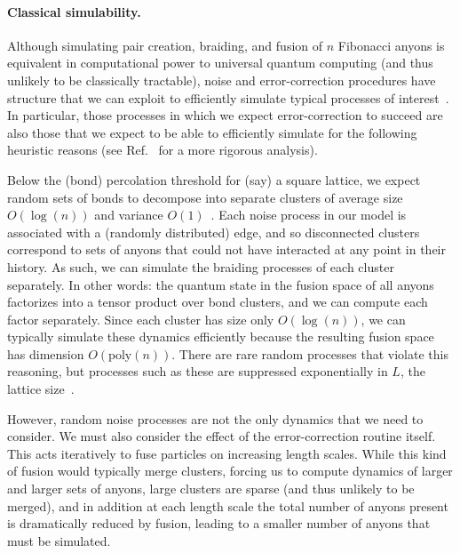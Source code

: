 \documentclass[aps, prl, letterpaper, twocolumn, superscriptaddress, notitlepage, 10pt]{revtex4-1}
\begin{document}
\paragraph{Classical simulability.}

Although simulating pair creation, braiding, and fusion of $n$ Fibonacci anyons is equivalent in computational power to universal quantum computing (and thus unlikely to be classically tractable), noise and error-correction procedures have structure that we can exploit to efficiently simulate typical processes of interest~\cite{RGsim}. In particular, those processes in which we expect error-correction to succeed are also those that we expect to be able to efficiently 
simulate for the following heuristic reasons (see Ref.~\cite{RGsim} for a more rigorous analysis).

Below the (bond) percolation threshold for (say) a square lattice, we expect random sets of bonds to decompose into separate clusters of average size $O(\log(n))$ and variance $O(1)$~\cite{Bazant2000}.  Each noise process in our model is associated with a (randomly distributed) edge, and so disconnected clusters correspond to sets of anyons that could not have interacted at any point in their history. As such, we can simulate the braiding processes of each cluster separately. In other words: the quantum state in the fusion space of all anyons factorizes into a tensor product over bond clusters, and we can compute each factor separately. Since each cluster has size only $O(\log(n))$, we can typically simulate these dynamics efficiently because the resulting fusion space has dimension $O(\mathrm{poly}(n))$. There are rare random processes that violate this reasoning, but processes such as these are suppressed exponentially in $L$, the lattice size~\cite{Grimmett1989}. 

However, random noise processes are not the only dynamics that we need to consider. We must also consider the effect of the error-correction routine itself. This acts iteratively to fuse particles on increasing length scales. While this kind of fusion would typically merge clusters, forcing us to compute dynamics of larger and larger sets of anyons, large clusters are sparse (and thus unlikely to be merged), and in addition at each length scale the total number of anyons present is dramatically reduced by fusion, leading to a smaller number of anyons that must be simulated.
\end{document}
